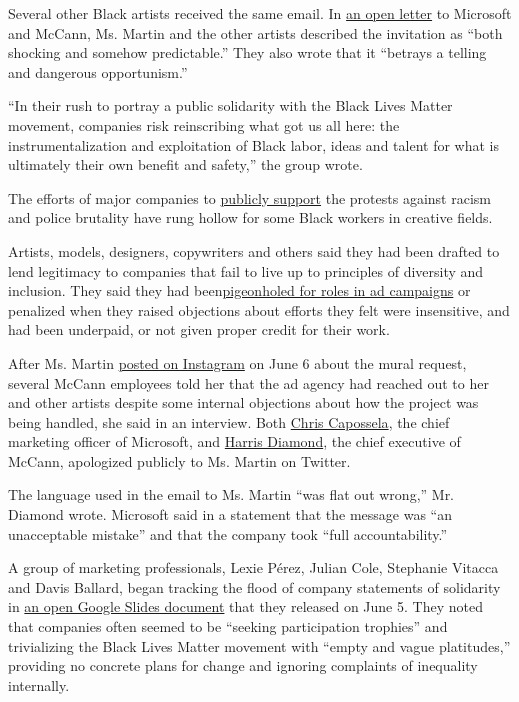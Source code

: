Several other Black artists received the same email. In
\href{https://www.wearerelevant.art/}{an open letter} to Microsoft and
McCann, Ms. Martin and the other artists described the invitation as
``both shocking and somehow predictable.'' They also wrote that it
``betrays a telling and dangerous opportunism.''

``In their rush to portray a public solidarity with the Black Lives
Matter movement, companies risk reinscribing what got us all here: the
instrumentalization and exploitation of Black labor, ideas and talent
for what is ultimately their own benefit and safety,'' the group wrote.

The efforts of major companies to
\href{https://www.nytimes.com/2020/05/31/business/media/companies-marketing-black-lives-matter-george-floyd.html}{publicly
support} the protests against racism and police brutality have rung
hollow for some Black workers in creative fields.

Artists, models, designers, copywriters and others said they had been
drafted to lend legitimacy to companies that fail to live up to
principles of diversity and inclusion. They said they had
been\href{https://www.adweek.com/agencies/deutsch-la-fires-cco-after-offensive-email-about-casting-black-talent-resurfaces/}{pigeonholed
for roles in ad campaigns} or penalized when they raised objections
about efforts they felt were insensitive, and had been underpaid, or not
given proper credit for their work.

After Ms. Martin \href{https://www.instagram.com/p/CBGn0IXA9Q9/}{posted
on Instagram} on June 6 about the mural request, several McCann
employees told her that the ad agency had reached out to her and other
artists despite some internal objections about how the project was being
handled, she said in an interview. Both
\href{https://twitter.com/chriscapossela/status/1269391530843729920?s=20}{Chris
Capossela}, the chief marketing officer of Microsoft, and
\href{https://twitter.com/HDiamond_McCann/status/1269396926899916808?s=20}{Harris
Diamond}, the chief executive of McCann, apologized publicly to Ms.
Martin on Twitter.

The language used in the email to Ms. Martin ``was flat out wrong,'' Mr.
Diamond wrote. Microsoft said in a statement that the message was ``an
unacceptable mistake'' and that the company took ``full
accountability.''

A group of marketing professionals, Lexie Pérez, Julian Cole, Stephanie
Vitacca and Davis Ballard, began tracking the flood of company
statements of solidarity in
\href{https://docs.google.com/presentation/d/19d2SDI4yEbkSyPnFqHNwcc7TAb_4PaVEza3FprS_2Nk/edit?fbclid=IwAR0wTovNMezg-Cw9j9QTG-U7K6Z8koq-xCudwIcbJy8BL_sdmulXaLwjxrE\#slide=id.g882d183bdc_1002_63}{an
open Google Slides document} that they released on June 5. They noted
that companies often seemed to be ``seeking participation trophies'' and
trivializing the Black Lives Matter movement with ``empty and vague
platitudes,'' providing no concrete plans for change and ignoring
complaints of inequality internally.

